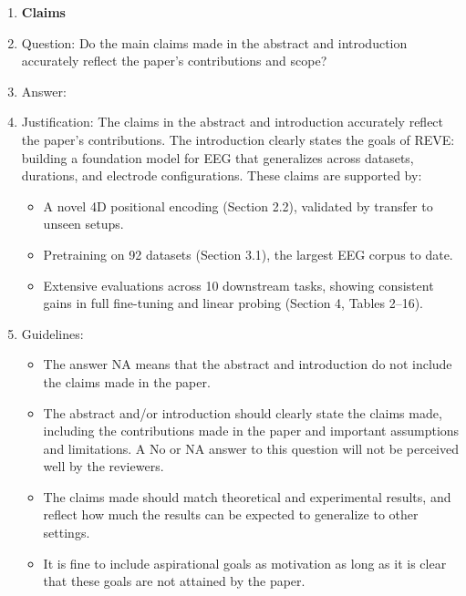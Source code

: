 \documentclass{article}
\begin{document}
\begin{enumerate}

\item {\bf Claims}
    \item[] Question: Do the main claims made in the abstract and introduction accurately reflect the paper's contributions and scope?
    \item[] Answer: \answerYes{} %
    \item[] Justification: The claims in the abstract and introduction accurately reflect the paper’s contributions. The introduction clearly states the goals of REVE: building a foundation model for EEG that generalizes across datasets, durations, and electrode configurations. These claims are supported by:
    \begin{itemize}
        \item  A novel 4D positional encoding (Section 2.2), validated by transfer to unseen setups.
        \item  Pretraining on 92 datasets (Section 3.1), the largest EEG corpus to date.
        \item  Extensive evaluations across 10 downstream tasks, showing consistent gains in full fine-tuning and linear probing (Section 4, Tables 2–16).
    \end{itemize}

    \item[] Guidelines:
    \begin{itemize}
        \item The answer NA means that the abstract and introduction do not include the claims made in the paper.
        \item The abstract and/or introduction should clearly state the claims made, including the contributions made in the paper and important assumptions and limitations. A No or NA answer to this question will not be perceived well by the reviewers. 
        \item The claims made should match theoretical and experimental results, and reflect how much the results can be expected to generalize to other settings. 
        \item It is fine to include aspirational goals as motivation as long as it is clear that these goals are not attained by the paper. 
    \end{itemize}


\end{enumerate}
\end{document}
